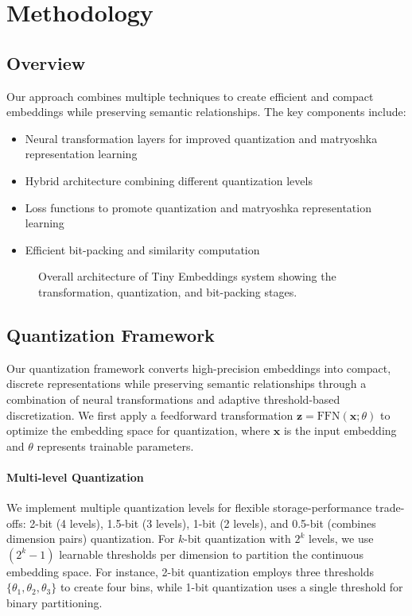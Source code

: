 \section{Methodology}
\label{sec:methodology}

\subsection{Overview}
Our approach combines multiple techniques to create efficient and compact embeddings while preserving semantic relationships. The key components include:
\begin{itemize}
    \item Neural transformation layers for improved quantization and matryoshka representation learning
    \item Hybrid architecture combining different quantization levels
    \item Loss functions to promote quantization and matryoshka representation learning
    \item Efficient bit-packing and similarity computation
\end{itemize}

\begin{figure}[h]
    \centering
    \caption{Overall architecture of Tiny Embeddings system showing the transformation, quantization, and bit-packing stages.}
    \label{fig:system_architecture}
\end{figure}


\subsection{Quantization Framework}
\label{subsec:quantization_framework}

Our quantization framework converts high-precision embeddings into compact, discrete representations while preserving semantic relationships through a combination of neural transformations and adaptive threshold-based discretization. We first apply a feedforward transformation $\mathbf{z} = \text{FFN}(\mathbf{x}; \theta)$ to optimize the embedding space for quantization, where $\mathbf{x}$ is the input embedding and $\theta$ represents trainable parameters.

\paragraph{Multi-level Quantization}
We implement multiple quantization levels for flexible storage-performance trade-offs: 2-bit (4 levels), 1.5-bit (3 levels), 1-bit (2 levels), and 0.5-bit (combines dimension pairs) quantization. For $k$-bit quantization with $2^k$ levels, we use $(2^k - 1)$ learnable thresholds per dimension to partition the continuous embedding space. For instance, 2-bit quantization employs three thresholds $\{\theta_1, \theta_2, \theta_3\}$ to create four bins, while 1-bit quantization uses a single threshold for binary partitioning.

